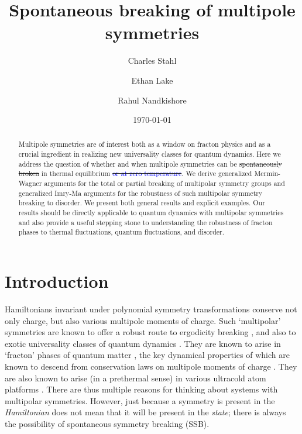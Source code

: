 \documentclass[pra,aps,twocolumn, amsfonts,amsmath,amssymb,nofootinbib,superscriptaddress]{revtex4-2}
\newcommand{\charlie}[1]{\textcolor{Blue}{#1}}
\providecommand{\DIFaddtex}[1]{{\protect\color{blue}\uwave{#1}}} %
\providecommand{\DIFdeltex}[1]{{\protect\color{red}\sout{#1}}}                      %
\providecommand{\DIFaddbegin}{} %
\providecommand{\DIFaddend}{} %
\providecommand{\DIFdelbegin}{} %
\providecommand{\DIFdelend}{} %
\providecommand{\DIFadd}[1]{\texorpdfstring{\DIFaddtex{#1}}{#1}} %
\providecommand{\DIFdel}[1]{\texorpdfstring{\DIFdeltex{#1}}{}} %
\newcommand{\DIFscaledelfig}{0.5}
\newlength{\DIFdelgraphicswidth} %
\newlength{\DIFdelgraphicsheight} %
\newcommand{\DIFaddincludegraphics}[2][]{{\color{blue}\fbox{\DIFOincludegraphics[#1]{#2}}}} %
\newcommand{\DIFdelincludegraphics}[2][]{%
\sbox{\DIFdelgraphicsbox}{\DIFOincludegraphics[#1]{#2}}%
\settoboxwidth{\DIFdelgraphicswidth}{\DIFdelgraphicsbox} %
\settoboxtotalheight{\DIFdelgraphicsheight}{\DIFdelgraphicsbox} %
\scalebox{\DIFscaledelfig}{%
\parbox[b]{\DIFdelgraphicswidth}{\usebox{\DIFdelgraphicsbox}\\[-\baselineskip] \rule{\DIFdelgraphicswidth}{0em}}\llap{\resizebox{\DIFdelgraphicswidth}{\DIFdelgraphicsheight}{%
\setlength{\unitlength}{\DIFdelgraphicswidth}%
\begin{picture}(1,1)%
\thicklines\linethickness{2pt} %
{\color[rgb]{1,0,0}\put(0,0){\framebox(1,1){}}}%
{\color[rgb]{1,0,0}\put(0,0){\line( 1,1){1}}}%
{\color[rgb]{1,0,0}\put(0,1){\line(1,-1){1}}}%
\end{picture}%
}\hspace*{3pt}}} %
} %
\DeclareRobustCommand{\DIFaddbegin}{\DIFOaddbegin \let\includegraphics\DIFaddincludegraphics} %
\DeclareRobustCommand{\DIFaddend}{\DIFOaddend \let\includegraphics\DIFOincludegraphics} %
\DeclareRobustCommand{\DIFdelbegin}{\DIFOdelbegin \let\includegraphics\DIFdelincludegraphics} %
\DeclareRobustCommand{\DIFdelend}{\DIFOaddend \let\includegraphics\DIFOincludegraphics} %
\begin{document}
\title{Spontaneous breaking of multipole symmetries}
\author{Charles Stahl}
\author{Ethan Lake}
\author{Rahul Nandkishore}


	
\begin{abstract}
Multipole symmetries are of interest both as a window on fracton physics and as a crucial ingredient in realizing new universality classes for quantum dynamics. Here we address the question of whether and when multipole symmetries can be \DIFdelbegin %
\DIFdel{spontaneously broken}%
\DIFdelend \DIFaddbegin \DIFadd{spontaneously broken, both }\DIFaddend in thermal equilibrium \DIFdelbegin \DIFdel{\charlie{or at zero temperature}}\DIFdelend \DIFaddbegin \DIFadd{and at zero temperature}\DIFaddend . We derive generalized Mermin-Wagner arguments for the total or partial breaking of multipolar symmetry groups and generalized Imry-Ma arguments for the robustness of such multipolar symmetry breaking to disorder. We present both general results and explicit examples. Our results should be directly applicable to quantum dynamics with multipolar symmetries and also provide a useful stepping stone to understanding the robustness of fracton phases to thermal fluctuations, quantum fluctuations, and disorder. 
\end{abstract}

\date{\today}

\maketitle

\section{Introduction}

Hamiltonians invariant under polynomial symmetry transformations conserve not only charge, but also various multipole moments of charge. Such `multipolar' symmetries are known to offer a robust route to ergodicity breaking \cite{PPN, KHN, Sala, Moudgalya, SLIOM, commutant}, and also to exotic universality classes of quantum dynamics \cite{Iaconis1, GLN, nonabelian, glorioso, MKH, Feldmeier, Iaconis2}. They are known to arise in `fracton' phases of quantum matter \cite{Chamon, Haah, VHF1, VHF2, NH, PretkoRadzihovsky}, the key dynamical properties of which are known to descend from conservation laws on multipole moments of charge \cite{Pretko1, BB,  Gromov2019}. They are also known to arise (in a prethermal sense) in various ultracold atom platforms \cite{KHN, Bakr, Aidelsburger}. There are thus multiple reasons for thinking about systems with multipolar symmetries. However, just because a symmetry is present in the {\it Hamiltonian} does not mean that it will be present in the {\it state}; there is always the possibility of spontaneous symmetry breaking (SSB). 
\end{document}
